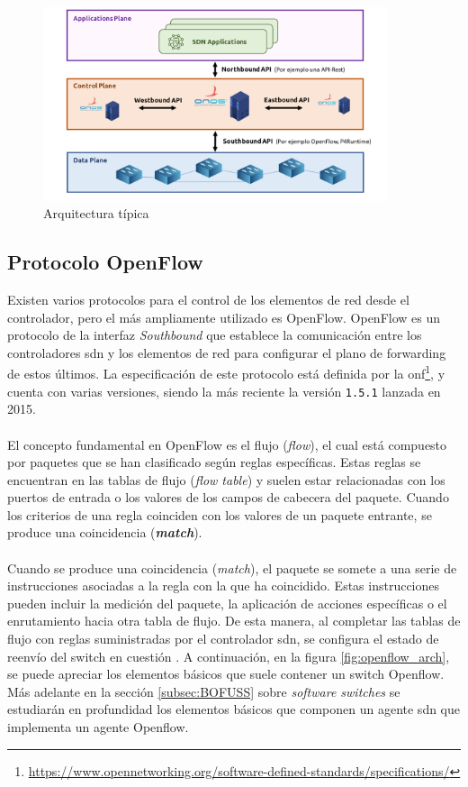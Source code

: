 \begin{figure}[ht]
    \centering
    \includegraphics[width=0.9\textwidth]{archivos/img/teoria/sdn_arch.png}
    \caption{Arquitectura típica  \cite{carrascal2020diseno}}
    \label{fig:sdnBasicArch}
\end{figure}

\subsection{Protocolo OpenFlow}

Existen varios protocolos para el control de los elementos de red desde el controlador, pero el más ampliamente utilizado es OpenFlow. OpenFlow es un protocolo de la interfaz \textit{Southbound} que establece la comunicación entre los controladores \gls{sdn} y los elementos de red para configurar el plano de forwarding de estos últimos. La especificación de este protocolo está definida por la \gls{onf}\footnote{\url{https://www.opennetworking.org/software-defined-standards/specifications/}}, y cuenta con varias versiones, siendo la más reciente la versión \texttt{1.5.1} lanzada en 2015.\\
\\
El concepto fundamental en OpenFlow es el flujo (\textit{flow}), el cual está compuesto por paquetes que se han clasificado según reglas específicas. Estas reglas se encuentran en las tablas de flujo (\textit{flow table}) y suelen estar relacionadas con los puertos de entrada o los valores de los campos de cabecera del paquete. Cuando los criterios de una regla coinciden con los valores de un paquete entrante, se produce una coincidencia (\textbf{\textit{match}}).\\
\\
Cuando se produce una coincidencia (\textit{match}), el paquete se somete a una serie de instrucciones asociadas a la regla con la que ha coincidido. Estas instrucciones pueden incluir la medición del paquete, la aplicación de acciones específicas o el enrutamiento hacia otra tabla de flujo. De esta manera, al completar las tablas de flujo con reglas suministradas por el controlador \gls{sdn}, se configura el estado de reenvío del switch en cuestión \cite{nadeau2013sdn}. A continuación, en la figura \ref{fig:openflow_arch}, se puede apreciar los elementos básicos que suele contener un switch Openflow. Más adelante en la sección \ref{subsec:BOFUSS} sobre \textit{software switches} se estudiarán en profundidad los elementos básicos que componen un agente \gls{sdn} que implementa un agente Openflow.


